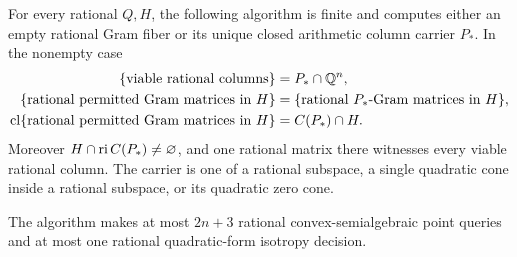 \begin{theorem}\label{thm:carrier}
For every rational $Q,H$, the following algorithm is finite and computes either an empty rational Gram fiber or its unique closed arithmetic column carrier $P_*$. In the nonempty case
\begin{align*}
 \{\text{viable rational columns}\}&=P_*\cap\mathbb Q^n,\\
 \{\text{rational permitted Gram matrices in }H\}
 &=\{\text{rational }P_*\text{-Gram matrices in }H\},\\
 \operatorname{cl}\{\text{rational permitted Gram matrices in }H\}&=C(P_*)\cap H.
\end{align*}
Moreover $H\cap\operatorname{ri} C(P_*)\ne\varnothing$, and one rational matrix there witnesses every viable rational column. The carrier is one of a rational subspace, a single quadratic cone inside a rational subspace, or its quadratic zero cone.

The algorithm makes at most $2n+3$ rational convex-semialgebraic point queries and at most one rational quadratic-form isotropy decision.
\end{theorem}
